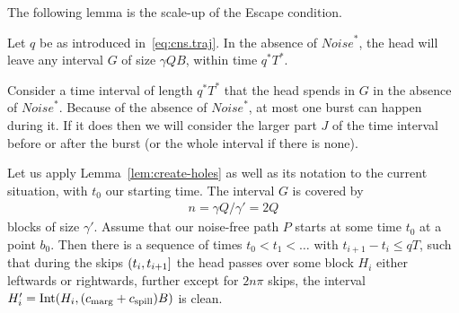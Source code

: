 \documentclass[11pt]{memoir}
\theoremstyle{definition} %
\renewcommand{\le}{\leq}
\def\B{B}
\renewcommand{\d}{d}
\newcommand{\escno}{q}
\newcommand{\g}{g}
\newcommand{\Int}{\mathrm{Int}} %
\newcommand{\Noise}{\mathit{Noise}}
\newcommand{\passno}{\pi}
\newcommand{\Q}{Q} %
\newcommand{\Tu}{T}
\newcommand{\cns}[1]{c_{\textrm{\upshape #1}}}
\newcommand{\CMarg}{\cns{marg}}
\newcommand{\CSpill}{\cns{spill}}
\begin{document}
The following lemma is the scale-up of the Escape condition.

\begin{lemma}[Escape]\label{lem:escape}
  Let  \( \escno \) be as introduced in~\eqref{eq:cns.traj}.
  In the absence of \( \Noise^{*} \), the
  head will leave any interval \( G \) of size \( \gamma\Q\B \),
  within time \( \escno^{*}\Tu^{*} \).
\end{lemma}
\begin{Proof}
  Consider a time interval of length \( \escno^{*}\Tu^{*} \) that the head
  spends in \( G \) in the absence of \( \Noise^{*} \).
  Because of the absence of \( \Noise^{*} \), at most one burst can happen during it.
  If it does then we will consider the larger part \( J \) of the time interval
  before or after the burst (or the whole interval if there is none).

  Let us apply Lemma~\ref{lem:create-holes} as well as its notation
  to the current situation, with \( t_{0} \) our starting time.
  The interval \( G \) is covered by 
\begin{align*}
 n=\gamma\Q/\gamma' =2\Q  
\end{align*}
blocks of size \( \gamma' \).
Assume that our noise-free path \( P \) starts
at some time \( t_{0} \) at a point \( b_{0} \).
Then there is a sequence of times \( t_{0}<t_{1}<\dots \) 
with \( t_{i+1}-t_{i}\le\escno\Tu \), such that during the skips
\( (t_{i},t_{i+1}] \) the head passes over some block \( H_{i} \)
either leftwards or rightwards, further
except for \( 2 n\passno \) skips, the interval
\( H'_{i}=\Int(H_{i},(\CMarg+\CSpill)\B) \) is clean.
 


\end{Proof}
\end{document}
